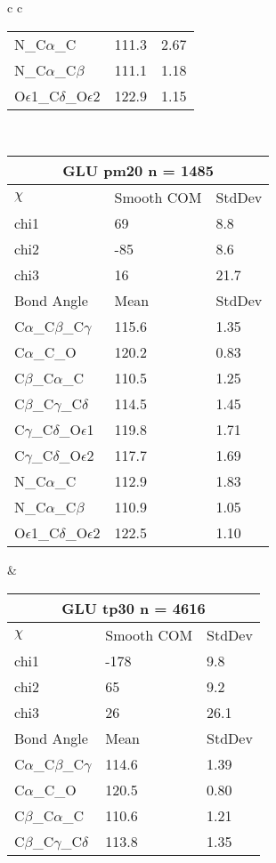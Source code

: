 \begin{longtable}{ c c }
\begin{tabular}{ l l l }
  N\_C$\alpha$\_C & 111.3 & 2.67\\
  N\_C$\alpha$\_C$\beta$ & 111.1 & 1.18\\
  O$\epsilon$1\_C$\delta$\_O$\epsilon$2 & 122.9 & 1.15\\
  \bottomrule
  \end{tabular}
  \\
  \begin{tabular}{ l l l }
  \toprule
  \multicolumn{3}{c}{GLU \textbf{pm20} n = 1485} \\ \toprule
  $\chi$       & Smooth COM & StdDev \\ \midrule
  chi1 & 69 & 8.8 \\ 
  chi2 & -85 & 8.6 \\ 
  chi3 & 16 & 21.7 \\ \midrule
  Bond Angle   & Mean     & StdDev \\ \midrule
  C$\alpha$\_C$\beta$\_C$\gamma$ & 115.6 & 1.35\\
  C$\alpha$\_C\_O & 120.2 & 0.83\\
  C$\beta$\_C$\alpha$\_C & 110.5 & 1.25\\
  C$\beta$\_C$\gamma$\_C$\delta$ & 114.5 & 1.45\\
  C$\gamma$\_C$\delta$\_O$\epsilon$1 & 119.8 & 1.71\\
  C$\gamma$\_C$\delta$\_O$\epsilon$2 & 117.7 & 1.69\\
  N\_C$\alpha$\_C & 112.9 & 1.83\\
  N\_C$\alpha$\_C$\beta$ & 110.9 & 1.05\\
  O$\epsilon$1\_C$\delta$\_O$\epsilon$2 & 122.5 & 1.10\\
  \bottomrule
  \end{tabular}
  &
  \begin{tabular}{ l l l }
  \toprule
  \multicolumn{3}{c}{GLU \textbf{tp30} n = 4616} \\ \toprule
  $\chi$       & Smooth COM & StdDev \\ \midrule
  chi1 & -178 & 9.8 \\ 
  chi2 & 65 & 9.2 \\ 
  chi3 & 26 & 26.1 \\ \midrule
  Bond Angle   & Mean     & StdDev \\ \midrule
  C$\alpha$\_C$\beta$\_C$\gamma$ & 114.6 & 1.39\\
  C$\alpha$\_C\_O & 120.5 & 0.80\\
  C$\beta$\_C$\alpha$\_C & 110.6 & 1.21\\
  C$\beta$\_C$\gamma$\_C$\delta$ & 113.8 & 1.35\\

\end{tabular}
\end{longtable}
